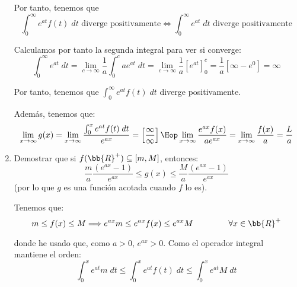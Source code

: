 \documentclass[12pt]{article}
\begin{document}
\begin{ejercicio}
\begin{enumerate}
        Por tanto, tenemos que
        \begin{equation*}
            \int_0^\infty e^{at}f(t)\;dt \text{ diverge positivamente}
            \Longleftrightarrow
            \int_0^\infty e^{at}\;dt \text{ diverge positivamente}
        \end{equation*}

        Calculamos por tanto la segunda integral para ver si converge:
        \begin{equation*}
            \int_0^\infty e^{at}\;dt
            = \lim_{c\to \infty} \frac{1}{a}\int_0^c ae^{at}\;dt
            = \lim_{c\to \infty} \frac{1}{a}\left[e^{at}\right]_0^c
            = \frac{1}{a}\left[\infty - e^0 \right] = \infty
        \end{equation*}

        Por tanto, tenemos que $\displaystyle \int_0^\infty e^{at}f(t)\;dt$ diverge positivamente.

        Además, tenemos que:
        \begin{equation*}
            \lim_{x\to \infty}g(x)=
            \lim_{x\to \infty}\frac{\int_0^x e^{at}f(t)\;dt}{e^{ax}} = \left[\frac{\infty}{\infty}\right]
            \Hop
            \lim_{x\to \infty}\frac{e^{ax}f(x)}{ae^{ax}}
            = \lim_{x\to \infty}\frac{f(x)}{a}= \frac{L}{a}
        \end{equation*}

        \item Demostrar que si $f(\bb{R}^+)\subseteq [m,M]$, entonces:
        \begin{equation*}
            \frac{m}{a}\frac{(e^{ax}-1)}{e^{ax}}\leq g(x)\leq \frac{M}{a}\frac{(e^{ax}-1)}{e^{ax}}
        \end{equation*}
        (por lo que $g$ es una función acotada cuando $f$ lo es).

        Tenemos que:
        \begin{equation*}
            m\leq f(x)\leq M
            \Longrightarrow 
            e^{ax}m\leq e^{ax}f(x)\leq e^{ax}M \hspace{1.5cm} \forall x\in \bb{R}^+
        \end{equation*}

        donde he usado que, como $a>0$, $e^{ax}>0$. Como el operador integral mantiene el orden:
        \begin{equation*}
            \int_0^x e^{at}m\;dt\leq \int_0^x e^{at}f(t)\;dt\leq \int_0^x e^{at}M\;dt
        \end{equation*}


\end{enumerate}
\end{ejercicio}
\end{document}
